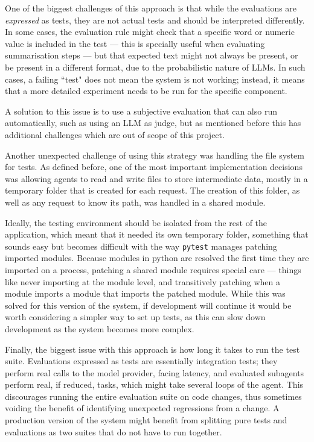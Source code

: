 \documentclass[a4paper]{report}
\begin{document}
One of the biggest challenges of this approach is that while the evaluations are \textit{expressed} as tests, they are not actual tests and should be interpreted differently. In some cases, the evaluation rule might check that a specific word or numeric value is included in the test --- this is specially useful when evaluating summarisation steps --- but that expected text might not always be present, or be present in a different format, due to the probabilistic nature of LLMs. In such cases, a failing ``test" does not mean the system is not working; instead, it means that a more detailed experiment needs to be run for the specific component.

A solution to this issue is to use a subjective evaluation that can also run automatically, such as using an LLM as judge, but as mentioned before this has additional challenges which are out of scope of this project.

Another unexpected challenge of using this strategy was handling the file system for tests. As defined before, one of the most important implementation decisions was allowing agents to read and write files to store intermediate data, mostly in a temporary folder that is created for each request. The creation of this folder, as well as any request to know its path, was handled in a shared module.

Ideally, the testing environment should be isolated from the rest of the application, which meant that it needed its own temporary folder, something that sounds easy but becomes difficult with the way \texttt{pytest} manages patching imported modules. Because modules in python are resolved the first time they are imported on a process, patching a shared module requires special care --- things like never importing at the module level, and transitively patching when a module imports a module that imports the patched module. While this was solved for this version of the system, if development will continue it would be worth considering a simpler way to set up tests, as this can slow down development as the system becomes more complex.

Finally, the biggest issue with this approach is how long it takes to run the test suite. Evaluations expressed as tests are essentially integration tests; they perform real calls to the model provider, facing latency, and evaluated subagents perform real, if reduced, tasks, which might take several loops of the agent. This discourages running the entire evaluation suite on code changes, thus sometimes voiding the benefit of identifying unexpected regressions from a change. A production version of the system might benefit from splitting pure tests and evaluations as two suites that do not have to run together.
\end{document}

